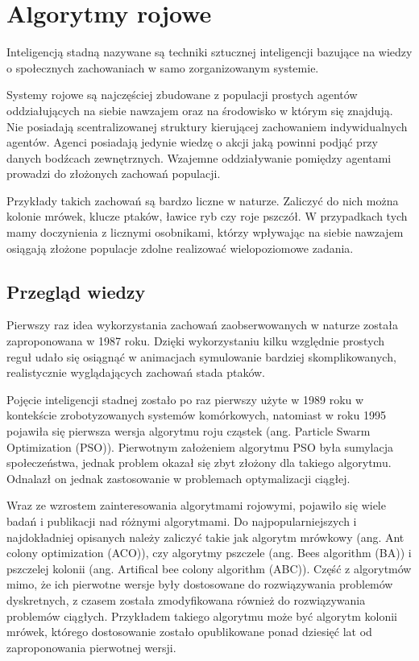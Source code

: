 \chapter{Algorytmy rojowe}
\label{cha:pso}
Inteligencją stadną nazywane są techniki sztucznej inteligencji bazujące na wiedzy o społecznych zachowaniach w samo zorganizowanym systemie. 

Systemy rojowe są najczęściej zbudowane z populacji prostych agentów oddziałujących na siebie nawzajem oraz na środowisko w którym się znajdują. Nie posiadają scentralizowanej struktury kierującej zachowaniem indywidualnych agentów. Agenci posiadają jedynie wiedzę o akcji jaką powinni podjąć przy danych bodźcach zewnętrznych. Wzajemne oddziaływanie pomiędzy agentami prowadzi do złożonych zachowań populacji.

Przykłady takich zachowań są bardzo liczne w naturze. Zaliczyć do nich można kolonie mrówek, klucze ptaków, ławice ryb czy roje pszczół. W przypadkach tych mamy doczynienia z licznymi osobnikami, którzy wpływając na siebie nawzajem osiągają złożone populacje zdolne realizować wielopoziomowe zadania.


\section{Przegląd wiedzy}
\label{sec:historiarojowych}
Pierwszy raz idea wykorzystania zachowań zaobserwowanych w naturze została zaproponowana w 1987 roku\cite{Reynolds87}. Dzięki wykorzystaniu kilku względnie prostych reguł udało się osiągnąć w animacjach symulowanie bardziej skomplikowanych, realistycznie wyglądających zachowań stada ptaków. 

Pojęcie inteligencji stadnej zostało po raz pierwszy użyte w 1989 roku\cite{BeniWang89} w kontekście zrobotyzowanych systemów komórkowych, natomiast w roku 1995\cite{KennedyEberhart95} pojawiła się pierwsza wersja algorytmu roju cząstek (ang. Particle Swarm Optimization (PSO)). Pierwotnym założeniem algorytmu PSO była sumylacja społeczeństwa, jednak problem okazał się zbyt złożony dla takiego algorytmu. Odnalazł on jednak zastosowanie w problemach optymalizacji ciągłej.

Wraz ze wzrostem zainteresowania algorytmami rojowymi, pojawiło się wiele badań i publikacji nad różnymi algorytmami. Do najpopularniejszych i najdokładniej opisanych należy zaliczyć takie jak algorytm mrówkowy (ang. Ant colony optimization (ACO))\cite{ACO}, czy algorytmy pszczele (ang. Bees algorithm (BA))\cite{BA} i pszczelej kolonii (ang. Artifical bee colony algorithm (ABC))\cite{ABC}. Część z algorytmów mimo, że ich pierwotne wersje były dostosowane do rozwiązywania problemów dyskretnych, z czasem została zmodyfikowana również do rozwiązywania problemów ciągłych. Przykładem takiego algorytmu może być algorytm kolonii mrówek, którego dostosowanie zostało opublikowane ponad dziesięć lat od zaproponowania pierwotnej wersji\cite{ACO2}. 

